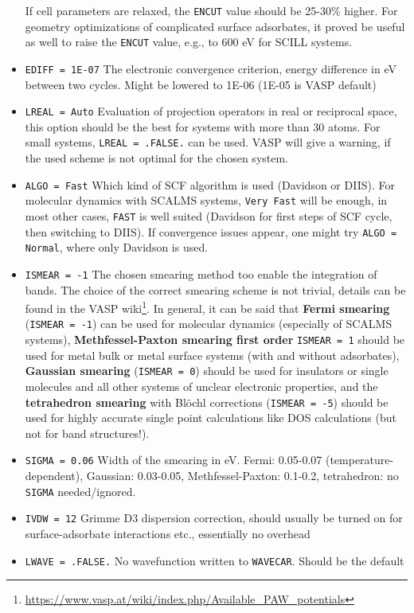 \documentclass[a4paper,11pt]{article}
\begin{document}
\begin{itemize}
If cell parameters are relaxed, the \texttt{ENCUT} value should be 25-30\% higher.
For geometry optimizations of complicated surface adsorbates, it proved be useful as well
to raise the \texttt{ENCUT} value, e.g., to 600 eV for SCILL systems.
\item \texttt{EDIFF = 1E-07}  The electronic convergence criterion, energy difference in eV between 
two cycles. Might be lowered to 1E-06 (1E-05 is VASP default)
\item \texttt{LREAL = Auto}   Evaluation of projection operators in real or reciprocal space, 
this option should be the best for systems with more than 30 atoms. For small systems, \texttt{LREAL =  .FALSE.} can be used. VASP will give a warning, if the used scheme is not optimal for the
chosen system.
\item \texttt{ALGO = Fast}   Which kind of SCF algorithm is used (Davidson or DIIS).
For molecular dynamics with SCALMS systems, \texttt{Very Fast} will be enough, in most
other cases, \texttt{FAST} is well suited (Davidson for first steps of SCF cycle, then
switching to DIIS). If convergence issues appear, one might try \texttt{ALGO = Normal},
where only Davidson is used.
\item \texttt{ISMEAR = -1}  The chosen smearing method too enable the integration of bands.
The choice of the correct smearing scheme is not trivial, details can be found in
the VASP wiki\footnote{\url{https://www.vasp.at/wiki/index.php/Available_PAW_potentials}}.
In general, it can be said that \textbf{Fermi smearing} (\texttt{ISMEAR = -1}) can be used for
molecular dynamics (especially of SCALMS systems), \textbf{Methfessel-Paxton smearing first
order} \texttt{ISMEAR = 1} should be used for metal bulk or metal surface systems
(with and without adsorbates), \textbf{Gaussian smearing} (\texttt{ISMEAR = 0}) should be used
for insulators or single molecules and all other systems of unclear electronic
properties, and the \textbf{tetrahedron smearing} with Blöchl corrections (\texttt{ISMEAR = -5}) should be used for highly
accurate single point calculations like DOS calculations (but not for band structures!).
\item \texttt{SIGMA = 0.06}  Width of the smearing in eV. Fermi: 0.05-0.07 (temperature-dependent),
Gaussian: 0.03-0.05, Methfessel-Paxton: 0.1-0.2, tetrahedron: no \texttt{SIGMA} needed/ignored.
\item \texttt{IVDW = 12}  Grimme D3 dispersion correction, should usually be turned on for surface-adsorbate interactions etc., essentially no overhead
\item \texttt{LWAVE = .FALSE.} No wavefunction written to \texttt{WAVECAR}. Should be the default 

\end{itemize}
\end{document}
